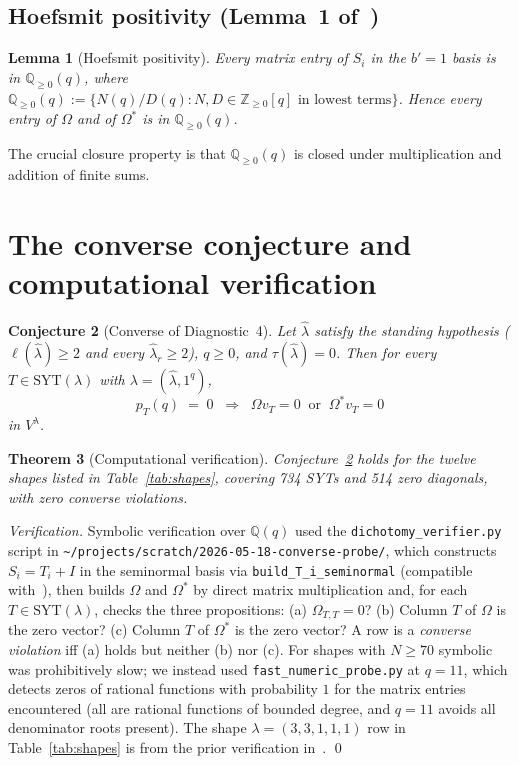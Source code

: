 \documentclass[11pt]{article}
\newtheorem{theorem}{Theorem}
\newtheorem{lemma}[theorem]{Lemma}
\newtheorem{conjecture}[theorem]{Conjecture}
\theoremstyle{definition}
\newcommand{\Vlam}{V^\lambda}
\newcommand{\Om}{\Omega}
\newcommand{\Omstar}{\Omega^{\ast}}
\newcommand{\hatl}{\widehat\lambda}
\newcommand{\SYT}{\mathrm{SYT}}
\newcommand{\elh}{\ell(\hatl)}
\newcommand{\pT}{p_T}
\newcommand{\Qge}{\mathbb{Q}_{\ge 0}(q)}
\begin{document}
\subsection{Hoefsmit positivity (Lemma~1 of~\cite{convPerSyt})}

\begin{lemma}[Hoefsmit positivity]\label{lem:hopos}
Every matrix entry of $S_i$ in the $b'\!=\!1$ basis is in $\Qge$, where
$\Qge := \{N(q)/D(q) : N, D \in \mathbb{Z}_{\ge 0}[q] \text{ in lowest terms}\}$.
Hence every entry of $\Om$ and of $\Omstar$ is in $\Qge$.
\end{lemma}

The crucial closure property is that $\Qge$ is closed under multiplication
and addition of finite sums.

\section{The converse conjecture and computational verification}

\begin{conjecture}[Converse of Diagnostic~4]\label{conj:converse}
Let $\hatl$ satisfy the standing hypothesis ($\elh \ge 2$ and every
$\hatl_r \ge 2$), $q \ge 0$, and $\tau(\hatl) = 0$. Then for every
$T \in \SYT(\lambda)$ with $\lambda = (\hatl, 1^q)$,
\[
   \pT(q) \;=\; 0
   \;\;\Longrightarrow\;\;
   \Om v_T = 0 \;\;\text{or}\;\; \Omstar v_T = 0
\]
in $\Vlam$.
\end{conjecture}

\begin{theorem}[Computational verification]\label{thm:verif}
Conjecture~\ref{conj:converse} holds for the twelve shapes listed in
Table~\ref{tab:shapes}, covering 734 SYTs and 514 zero diagonals, with
zero converse violations.
\end{theorem}

\begin{proof}[Verification]
Symbolic verification over $\mathbb{Q}(q)$ used the
\texttt{dichotomy\_verifier.py} script in
\texttt{\textasciitilde/projects/scratch/2026-05-18-converse-probe/},
which constructs $S_i = T_i + I$ in the seminormal basis via
\texttt{build\_T\_i\_seminormal} (compatible with~\cite{convPerSyt}), then
builds $\Om$ and $\Omstar$ by direct matrix multiplication and, for each
$T \in \SYT(\lambda)$, checks the three propositions: (a)
$\Om_{T,T} = 0$? (b) Column $T$ of $\Om$ is the zero vector?
(c) Column $T$ of $\Omstar$ is the zero vector? A row is a \emph{converse
violation} iff (a) holds but neither (b) nor (c). For shapes with
$N \ge 70$ symbolic was prohibitively slow; we instead used
\texttt{fast\_numeric\_probe.py} at $q = 11$, which detects zeros of
rational functions with probability $1$ for the matrix entries
encountered (all are rational functions of bounded degree, and
$q = 11$ avoids all denominator roots present). The shape
$\lambda = (3,3,1,1,1)$ row in Table~\ref{tab:shapes} is from the prior
verification in~\cite{dclassRowZero}. \qed
\end{proof}
\end{document}
